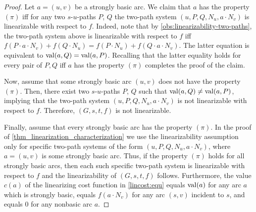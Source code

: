 \begin{proof}
    Let $a = (u, v)$ be a strongly basic arc. We claim that $a$ has the property $(\pi)$ iff for any two  $s$-$u$-paths $P$, $Q$  the two-path system $(u,P,Q,N_u,a \cdot N_v)$ is linearizable with respect to $f$. Indeed, note that by \cref{obs:linearizability-two-paths}, the   two-path system above is linearizable with respect to $f$  iff $f(P \cdot a \cdot N_v) + f(Q \cdot N_u) = f(P \cdot N_u) + f(Q \cdot a \cdot N_v)$. The latter equation is equivalent to $\operatorname{val}(a,Q) = \operatorname{val}(a,P)$. Recalling that  the latter equality  
     holds for every pair of $P, Q$ iff $a$ has the property $(\pi)$ completes the proof of the claim.
    
    Now, assume that some strongly basic arc $(u,v)$ does not have the property $(\pi)$. Then, there exist two $s$-$u$-paths $P$, $Q$ such that $\operatorname{val}(a,Q) \neq \operatorname{val}(a,P)$, implying that 
    the  two-path system $(u,P,Q,N_u,a \cdot N_v)$ is not linearizable with respect to $f$. Therefore,  $(G,s,t,f)$ is  not linearizable.
    
    Finally, assume that every strongly basic arc has the property $(\pi)$. 
  In the proof of \cref{thm_linearization_characterization}
    we  use the linearizability assumption   only for  specific two-path systems  of the  form $(u, P, Q, N_u, a \cdot N_v)$,  where   $a = (u, v)$ is some strongly basic arc. Thus,  if the property $(\pi)$ holds for all strongly basic arcs, then  each such specific two-path system is linearizable with respect to $f$ and the linearizability of $(G,s,t,f)$ follows. Furthermore, the value $c(a)$ of the linearizing cost function in \cref{lincost:equ}   equals  $\operatorname{val}(a)$ for  any arc $a$ which is  strongly basic, equals $f(a \cdot N_v)$ for any arc $(s,v)$ incident to $s$, and equals $0$ for any   nonbasic arc $a$. 
\end{proof}

